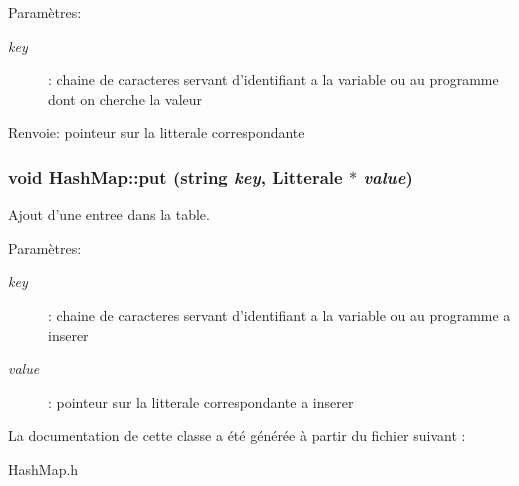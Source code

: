 \begin{Desc}
\item[Paramètres:]
\begin{description}
\item[{\em key}]: chaine de caracteres servant d'identifiant a la variable ou au programme dont on cherche la valeur \end{description}
\end{Desc}
\begin{Desc}
\item[Renvoie:]pointeur sur la litterale correspondante \end{Desc}
\hypertarget{class_hash_map_79196be9d74f1da3c2985e19c50e4790}{
\subsubsection[{put}]{\setlength{\rightskip}{0pt plus 5cm}void HashMap::put (string {\em key}, \/  {\bf Litterale} $\ast$ {\em value})}}
\label{class_hash_map_79196be9d74f1da3c2985e19c50e4790}


Ajout d'une entree dans la table. 

\begin{Desc}
\item[Paramètres:]
\begin{description}
\item[{\em key}]: chaine de caracteres servant d'identifiant a la variable ou au programme a inserer \item[{\em value}]: pointeur sur la litterale correspondante a inserer \end{description}
\end{Desc}


La documentation de cette classe a été générée à partir du fichier suivant :\begin{CompactItemize}
\item 
HashMap.h\end{CompactItemize}
